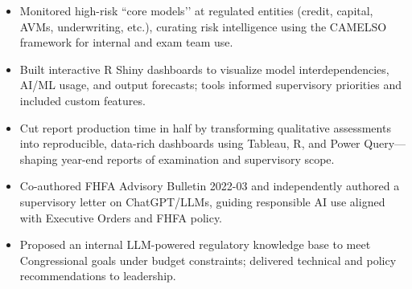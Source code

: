 \begin{itemize}
\item Monitored high-risk ``core models’’ at regulated entities (credit, capital, AVMs, underwriting, etc.), curating risk intelligence using the CAMELSO framework for internal and exam team use.
\item Built interactive R Shiny dashboards to visualize model interdependencies, AI/ML usage, and output forecasts; tools informed supervisory priorities and included custom features.
\item Cut report production time in half by transforming qualitative assessments into reproducible, data-rich dashboards using Tableau, R, and Power Query—shaping year-end reports of examination and supervisory scope.
\item Co-authored FHFA Advisory Bulletin 2022-03 and independently authored a supervisory letter on ChatGPT/LLMs, guiding responsible AI use aligned with Executive Orders and FHFA policy.
\item Proposed an internal LLM-powered regulatory knowledge base to meet Congressional goals under budget constraints; delivered technical and policy recommendations to leadership.
\end{itemize}

